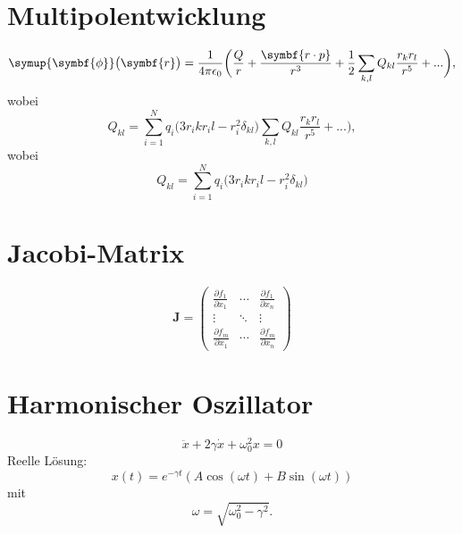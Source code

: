 \documentclass{scrartcl}
\newcommand{\be}{\begin{equation}} %
\newcommand{\ee}{\end{equation}} %
\begin{document}
\section{Multipolentwicklung}
\be
\symup{\symbf{\phi}}\bigl(\symbf{r}\bigr)=\frac{1}{4\pi\epsilon_0}
\biggl(\frac{Q}{r}+\frac{\symbf{r\cdot p}}{r^3}+\frac{1}{2}
\sum_{k,l}Q_{kl}\frac{r_k r_l}{r^5}+...\biggr) \label{eqn:19},
\ee
wobei
\begin{equation*} %
  Q_{k l}=
  \sum_{i=1}^N %
  q_i\bigl(3r_i k r_i l -r^2_i \delta_{kl} \bigr)
\sum_{k,l}Q_{k l} \frac{r_k r_l}{r^5}+...\biggr) \label{eqn:19},
\end{equation*}
wobei
\begin{equation*} %
  Q_{k l}=
  \sum_{i=1}^N %
   q_i \bigl(3r_ik r_il -r^2_i \delta_{kl} \bigr)%
\end{equation*}
\section{Jacobi-Matrix}
\begin{equation}
  \symbf{J}=
  \begin{pmatrix}
    \frac{\partial f_1}{\partial x_1} & \cdots & \frac{\partial f_1}{\partial x_n}
    \\ %
    \vdots & %
    \ddots & %
    \vdots \\
    \frac{\partial f_m}{\partial x_1} & \cdots %
    & \frac{\partial f_m}{\partial x_n}
  \end{pmatrix}
\end{equation}
\newpage
\section{Harmonischer Oszillator}
\begin{equation}
  \ddot{x}+2\gamma\dot{x}+\omega_0^2 x=0 \label{eqn:osz}
\end{equation}
Reelle Lösung:
\be
x(t)=e^{-\gamma t} (A\cos(\omega t)+B\sin(\omega t))
\label{eqn:reel}
\ee
mit
\be
\omega=\sqrt{\omega_0^2 - \gamma^2}. \label{eqn:omg}
\ee
\end{document}

